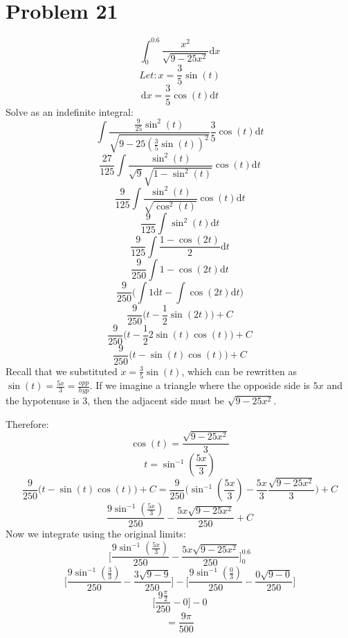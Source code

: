 \documentclass[letterpaper, 12pt]{article}
\renewcommand*{\arcsin}{\sin^{-1}}
\newcommand*{\diff}{\mathrm{d}}
\begin{document}
\section*{Problem 21}
\[ \int_{0}^{0.6}{\frac{x^{2}}{\sqrt{9-25x^{2}}}\diff{x}} \]
\[ Let: x = \frac{3}{5}\sin(t) \]
\[ \diff{x} = \frac{3}{5}\cos(t)\diff{t} \]
Solve as an indefinite integral:
\[ \int{\frac{\frac{9}{25}\sin^{2}(t)}{\sqrt{9-25(\frac{3}{5}\sin(t))^{2}}}
   \frac{3}{5}\cos(t)\diff{t}} \]
\[ \frac{27}{125}\int{\frac{\sin^{2}(t)}
   {\sqrt{9}\sqrt{1-\sin^{2}(t)}}\cos(t)\diff{t}} \]
\[ \frac{9}{125}\int{\frac{\sin^{2}(t)}{\sqrt{\cos^{2}(t)}}\cos(t)\diff{t}} \]
\[ \frac{9}{125}\int{\sin^{2}(t)\diff{t}} \]
\[ \frac{9}{125}\int{\frac{1-\cos(2t)}{2}\diff{t}} \]
\[ \frac{9}{250}\int{1-\cos(2t)\diff{t}} \]
\[ \frac{9}{250}\bigg(\int{1\diff{t}}-\int{\cos(2t)\diff{t}}\bigg) \]
\[ \frac{9}{250}\bigg(t-\frac{1}{2}\sin(2t)\bigg)+C \]
\[ \frac{9}{250}\bigg(t-\frac{1}{2}2\sin(t)\cos(t)\bigg)+C \]
\[ \frac{9}{250}\bigg(t-\sin(t)\cos(t)\bigg)+C \]
Recall that we substituted \( x = \frac{3}{5}\sin(t) \), which can be rewritten
as \( \sin(t) = \frac{5x}{3} = \frac{opp}{hyp} \). If we imagine a triangle
where the opposide side is \( 5x \) and the hypotenuse is 3, then the adjacent
side must be \( \sqrt{9-25x^{2}} \).
\begin{center}
\end{center}
Therefore:
\[ \cos(t) = \frac{\sqrt{9-25x^{2}}}{3} \]
\[ t = \arcsin(\frac{5x}{3}) \]
\[ \frac{9}{250}\bigg(t-\sin(t)\cos(t)\bigg)+C =
   \frac{9}{250}\bigg(\arcsin(\frac{5x}{3})-
   \frac{5x}{3}\frac{\sqrt{9-25x^{2}}}{3}\bigg)+C \]
\[ \frac{9\arcsin(\frac{5x}{3})}{250}-\frac{5x\sqrt{9-25x^{2}}}{250}+C \]
Now we integrate using the original limits:
\[ \bigg[\frac{9\arcsin(\frac{5x}{3})}{250}-
   \frac{5x\sqrt{9-25x^{2}}}{250}\bigg]_{0}^{0.6} \]
\[ \bigg[\frac{9\arcsin(\frac{3}{3})}{250}-\frac{3\sqrt{9-9}}{250}\bigg]-
   \bigg[\frac{9\arcsin(\frac{0}{3})}{250}-\frac{0\sqrt{9-0}}{250}\bigg] \]
\[ \bigg[\frac{9\frac{\pi}{2}}{250}-0\bigg]-0 \]
\[ = \frac{9\pi}{500} \]
\end{document}
